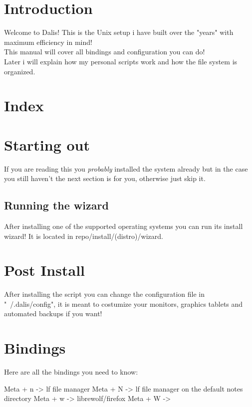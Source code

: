 \documentclass{article}
\author{Dário Batista}
\begin{document}
\section{Introduction}

Welcome to Dalis! This is the Unix setup i have built over the "years" with
maximum efficiency in mind!\\
This manual will cover all bindings and configuration you can do!\\
Later i will explain how my personal scripts work and how the file system is organized.

\section{Index}

\section{Starting out}
If you are reading this you \textit{probably} installed the system already but
in the case you still haven't the next section is for you, otherwise just skip it.

\subsection{Running the wizard}
After installing one of the supported operating systems you can run its install wizard!
It is located in repo/install/(distro)/wizard.\\

\section{Post Install}
After installing the script you can change the configuration file in "~/.dalis/config",
it is meant to costumize your monitors, graphics tablets and automated backups if you want!

\section{Bindings}
Here are all the bindings you need to know:

Meta + n -> lf file manager
Meta + N -> lf file manager on the default notes directory
Meta + w -> librewolf/firefox
Meta + W -> 
\end{document}
